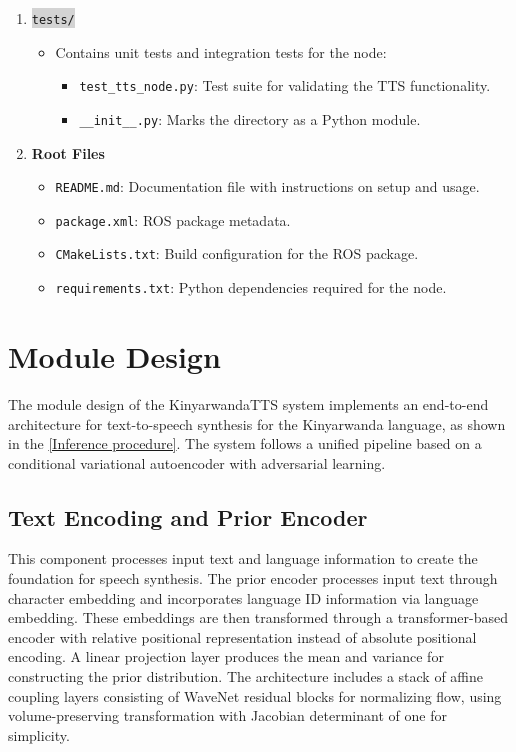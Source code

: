 \documentclass{CSSRforAfrica}
\begin{document}
\begin{enumerate}
    \item \colorbox{lightgray}{\texttt{tests/}}
    \begin{itemize}
        \item Contains unit tests and integration tests for the node:
        \begin{itemize}
            \item \texttt{test\_tts\_node.py}: Test suite for validating the TTS functionality.
            \item \texttt{\_\_init\_\_.py}: Marks the directory as a Python module.
        \end{itemize}
    \end{itemize}
    
    \item \textbf{Root Files}
    \begin{itemize}
        \item \texttt{README.md}: Documentation file with instructions on setup and usage.
        \item \texttt{package.xml}: ROS package metadata.
        \item \texttt{CMakeLists.txt}: Build configuration for the ROS package.
        \item \texttt{requirements.txt}: Python dependencies required for the node.
    \end{itemize}    
\end{enumerate}


\newpage
\section{Module Design}

The module design of the KinyarwandaTTS system implements an end-to-end architecture for text-to-speech synthesis for the Kinyarwanda language, as shown in the \ref{Inference procedure}. The system follows a unified pipeline based on a conditional variational autoencoder with adversarial learning.


\subsection {Text Encoding and Prior Encoder}

This component processes input text and language information to create the foundation for speech synthesis. The prior encoder processes input text through character embedding and incorporates language ID information via language embedding. These embeddings are then transformed through a transformer-based encoder with relative positional representation instead of absolute positional encoding. A linear projection layer produces the mean and variance for constructing the prior distribution. The architecture includes a stack of affine coupling layers consisting of WaveNet residual blocks for normalizing flow, using volume-preserving transformation with Jacobian determinant of one for simplicity\cite{kim2021conditional}.
\end{document}
